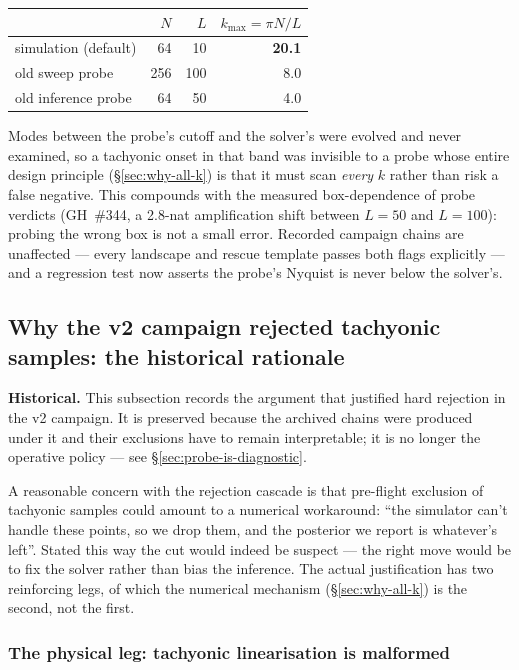 \begin{center}
\begin{tabular}{@{}lrrr@{}}
\toprule
 & $N$ & $L$ & $k_{\max} = \pi N / L$ \\
\midrule
simulation (default)  & 64  & 10  & \textbf{20.1} \\
old sweep probe       & 256 & 100 & 8.0 \\
old inference probe   & 64  & 50  & 4.0 \\
\bottomrule
\end{tabular}
\end{center}

Modes between the probe's cutoff and the solver's were evolved and never
examined, so a tachyonic onset in that band was invisible to a probe
whose entire design principle (\S\ref{sec:why-all-k}) is that it must
scan \emph{every} $k$ rather than risk a false negative.  This compounds
with the measured box-dependence of probe verdicts (GH~\#344, a 2.8-nat
amplification shift between $L = 50$ and $L = 100$): probing the wrong
box is not a small error.  Recorded campaign chains are unaffected --- every
landscape and rescue template passes both flags explicitly --- and a
regression test now asserts the probe's Nyquist is never below the
solver's.

\subsection{Why the v2 campaign rejected tachyonic samples: the
historical rationale}
\label{sec:tachyonic-physical}

\textbf{Historical.}  This subsection records the argument that
justified hard rejection in the v2 campaign.  It is preserved because
the archived chains were produced under it and their exclusions have to
remain interpretable; it is no longer the operative policy --- see
\S\ref{sec:probe-is-diagnostic}.

A reasonable concern with the rejection cascade is that pre-flight
exclusion of tachyonic samples could amount to a numerical workaround:
``the simulator can't handle these points, so we drop them, and the
posterior we report is whatever's left''. Stated this way the cut
would indeed be suspect --- the right move would be to fix the solver
rather than bias the inference. The actual justification has two
reinforcing legs, of which the numerical mechanism
(\S\ref{sec:why-all-k}) is the second, not the first.

\subsubsection{The physical leg: tachyonic linearisation is malformed}

